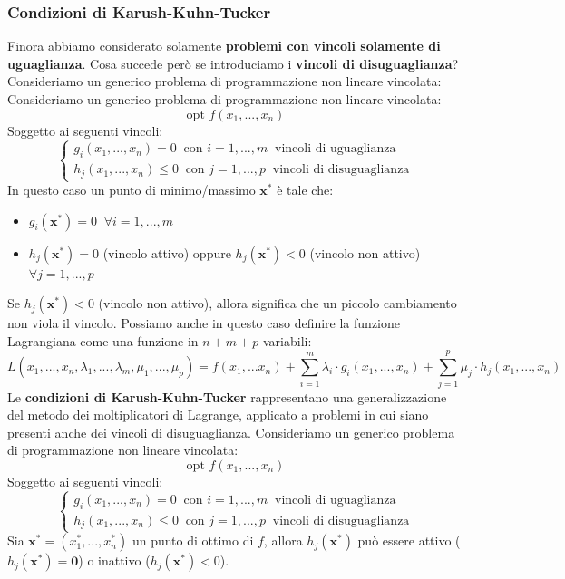 \documentclass[12pt]{article}
\begin{document}
\subsubsection{Condizioni di Karush-Kuhn-Tucker}
Finora abbiamo considerato solamente \textbf{problemi con vincoli solamente di uguaglianza}. Cosa succede però se introduciamo i \textbf{vincoli di disuguaglianza}? Consideriamo
un generico problema di programmazione non lineare vincolata:
Consideriamo un generico problema di programmazione non lineare vincolata:
$$\textrm{opt } f(x_1,...,x_n)$$
Soggetto ai seguenti vincoli:
$$\begin{cases}
    g_i(x_1,...,x_n) = 0 \; \; \textrm{con } i = 1,...,m \; \;  \textrm{vincoli di uguaglianza} \\
    h_j(x_1,...,x_n) \leq 0 \; \;  \textrm{con } j = 1,...,p \; \;  \textrm{vincoli di disuguaglianza}
\end{cases}$$
In questo caso un punto di minimo/massimo $\boldsymbol{x}^*$ è tale che:
\begin{itemize}
    \item $g_i(\boldsymbol{x}^*) = 0 \; \; \forall i = 1,...,m$
    \item $h_j(\boldsymbol{x}^*) = 0$ (vincolo attivo) oppure $h_j(\boldsymbol{x}^*) < 0$ (vincolo non attivo) $\forall j = 1,...,p$
\end{itemize}
Se $h_j(\boldsymbol{x}^*) < 0$ (vincolo non attivo), allora significa che un piccolo cambiamento non viola il vincolo.
Possiamo anche in questo caso definire la funzione Lagrangiana come una funzione in $n+m+p$ variabili:
$$L(x_1,...,x_n,\lambda_1,...,\lambda_m,\mu_1,...,\mu_p) = f(x_1,...x_n) + \sum_{i=1}^{m} \lambda_i \cdot g_i(x_1,...,x_n) + \sum_{j=1}^{p}\mu_j\cdot h_j(x_1,...,x_n)$$
Le \textbf{condizioni di Karush-Kuhn-Tucker} rappresentano una generalizzazione del metodo dei moltiplicatori di Lagrange, applicato a problemi in cui siano presenti anche dei vincoli di disuguaglianza.
Consideriamo un generico problema di programmazione non lineare vincolata:
$$\textrm{opt } f(x_1,...,x_n)$$
Soggetto ai seguenti vincoli:
$$\begin{cases}
    g_i(x_1,...,x_n) = 0 \; \; \textrm{con } i = 1,...,m \; \;  \textrm{vincoli di uguaglianza} \\
    h_j(x_1,...,x_n) \leq 0 \; \;  \textrm{con } j = 1,...,p \; \;  \textrm{vincoli di disuguaglianza}
\end{cases}$$
Sia $\boldsymbol{x}^* = (x_1^*,...,x_n^*)$ un punto di ottimo di $f$, allora $h_j(\boldsymbol{x}^*)$ può essere attivo ($h_j(\boldsymbol{x^*}) = \boldsymbol{0}$) o inattivo ($h_j(\boldsymbol{x}^*) <0$).
\end{document}
